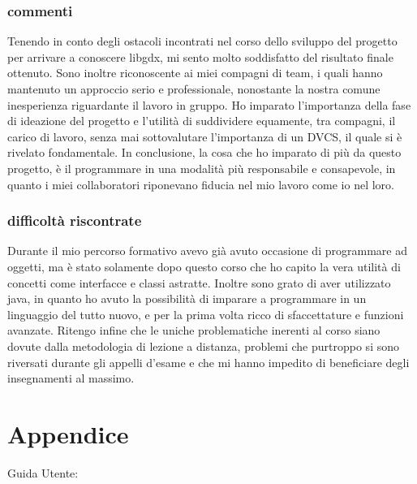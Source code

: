 \documentclass[a4paper,12pt]{report}
\begin{document}
\subsection{commenti}
Tenendo in conto degli ostacoli incontrati nel corso dello sviluppo del progetto per arrivare a conoscere libgdx, mi sento molto soddisfatto del risultato finale ottenuto.
Sono inoltre riconoscente ai miei compagni di team, i quali hanno mantenuto un approccio serio e professionale, nonostante la nostra comune inesperienza riguardante il lavoro in gruppo.
Ho imparato l'importanza della fase di ideazione del progetto e l'utilità di suddividere equamente, tra compagni, il carico di lavoro, senza mai sottovalutare l'importanza di un DVCS, il quale si è rivelato fondamentale.
In conclusione, la cosa che ho imparato di più da questo progetto, è il programmare in una modalità più responsabile e consapevole, in quanto i miei collaboratori riponevano fiducia nel mio lavoro come io nel loro.
\subsection{difficoltà riscontrate}
Durante il mio percorso formativo avevo già avuto occasione di programmare ad oggetti, ma è stato solamente dopo questo corso che ho capito la vera utilità di concetti come interfacce e classi astratte. Inoltre sono grato di aver utilizzato java, in quanto ho avuto la possibilità di imparare a programmare in un linguaggio del tutto nuovo, e per la prima volta ricco di sfaccettature e funzioni avanzate.
Ritengo infine che le uniche problematiche inerenti al corso siano dovute dalla metodologia di lezione a distanza, problemi che purtroppo si sono riversati durante gli appelli d'esame e che mi hanno impedito di beneficiare degli insegnamenti al massimo.
\newpage

\chapter{Appendice}
Guida Utente: \\
\end{document}
